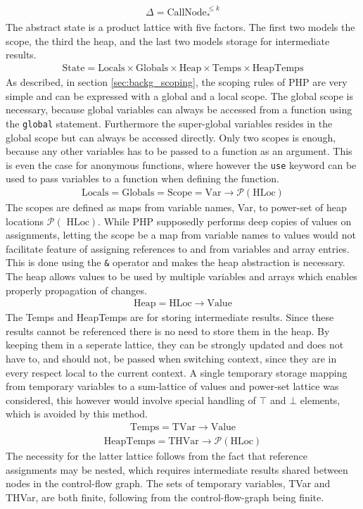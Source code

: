 \begin{align}
\Delta = \text{CallNode}_*^{\leq k}
\end{align}
The abstract state is a product lattice with five factors. The first two models the scope, the third the heap, and the last two models storage for intermediate results. 
\begin{align}
\text{State} = \text{Locals} \times \text{Globals} \times \text{Heap} \times \text{Temps} \times \text{HeapTemps} 
\end{align}
As described, in section \ref{sec:backg_scoping}, the scoping rules of PHP are very simple and can be expressed with a global and a local scope. The global scope is necessary, because global variables can always be accessed from a function using the \texttt{global} statement. Furthermore the super-global variables resides in the global scope but can always be accessed directly. Only two scopes is enough, because any other variables has to be passed to a function as an argument. This is even the case for anonymous functions, where however the \texttt{use} keyword can be used to pass variables to a function when defining the function.
\begin{align}
\text{Locals} = \text{Globals} = \text{Scope} = \text{Var} \rightarrow \mathcal{P}(\text{HLoc})
\end{align}
The scopes are defined as maps from variable names, { Var}, to power-set of heap locations $\mathcal{P}(\text{ HLoc})$. While PHP supposedly performs deep copies of values on assignments, letting the scope be a map from variable names to values would not facilitate feature of assigning references to and from variables and array entries. This is done using the \texttt{\&} operator and makes the heap abstraction is necessary. The heap allows values to be used by multiple variables and arrays which enables properly propagation of changes. 
\begin{align}
\text{Heap} = \text{HLoc} \rightarrow \text{Value}
\end{align}
The { Temps} and { HeapTemps} are for storing intermediate results. Since these results cannot be referenced there is no need to store them in the heap. By keeping them in a seperate lattice, they can be strongly updated and does not have to, and should not, be passed when switching context, since they are in every respect local to the current context. A single temporary storage mapping from temporary variables to a sum-lattice of values and power-set lattice was considered, this however would involve special handling of $\top$ and $\bot$ elements, which is avoided by this method. 
\begin{align}
\text{Temps} = \text{TVar} \rightarrow \text{Value}
\end{align}
\begin{align}
\text{HeapTemps} = \text{THVar} \rightarrow \mathcal{P}(\text{HLoc})
\end{align}
The necessity for the latter lattice follows from the fact that reference assignments may be nested, which requires intermediate results shared between nodes in the control-flow graph. The sets of temporary variables, { TVar} and { THVar}, are both finite, following from the control-flow-graph being finite.

